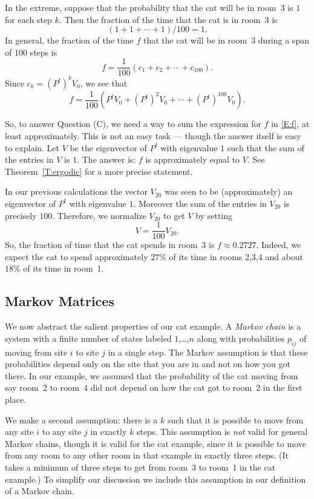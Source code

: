 \documentclass{ximera}
\begin{document}
In the extreme, suppose that the probability that the cat will be in room~3 is
$1$ for each step $k$.  Then the fraction of the time that the cat is in room~3
is
\[
(1 + 1 + \cdots + 1)/100 = 1.
\]
In general, the fraction of the time $f$ that the cat will be in room~3
during a span of $100$ steps is
\[
f = \frac{1}{100}(c_1 + c_2 +\cdots + c_{100}).
\]
Since $c_k = (P^t)^kV_0$, we see that
\begin{equation}  \label{E:f}
f = \frac{1}{100}(P^tV_0 + (P^t)^2V_0 + \cdots + (P^t)^{100}V_0).
\end{equation}

So, to answer Question (C), we need a way to sum the expression for $f$
in \eqref{E:f}, at least approximately.  This is not an easy task --- though
the answer itself is easy to explain.  Let $V$ be the eigenvector of $P^t$
with eigenvalue $1$ such that the sum of the entries in $V$ is $1$.  The
answer is: $f$ is approximately equal to $V$.  See Theorem~\ref{T:ergodic}
for a more precise statement.

In our previous calculations the vector $V_{20}$ was seen to be (approximately)
an eigenvector of $P^t$ with eigenvalue $1$.  Moreover the sum of the entries
in $V_{20}$ is precisely $100$.  Therefore, we normalize $V_{20}$ to get $V$
by setting
\[
V =\frac{1}{100}V_{20}.
\]
So, the fraction of time that the cat spends in room~3 is $f\approx 0.2727$.
Indeed, we expect the cat to spend approximately $27\%$ of its time in rooms
2,3,4 and about $18\%$ of its time in room~1.

\subsection*{Markov Matrices}

We now abstract the salient properties of our cat example.  A
{\em Markov chain\/} is a system with a
finite number of states labeled
$1$,\dots,$n$ along with probabilities $p_{ij}$ of moving from site $i$ to
site $j$ in a single step.  The Markov assumption is that these probabilities
depend only on the site that you are in and not on how you got there.  In our
example, we assumed that the probability of the cat moving from say room~2 to
room~4 did not depend on how the cat got to room~2 in the first place.

We make a second assumption: there is a $k$ such that it is possible to move
from any site $i$ to any site $j$ in exactly $k$ steps.  This assumption is
{\em not\/} valid for general Markov chains, though it is valid for the cat
example, since it is possible to move from any room to any other room in that
example in exactly three steps.  (It takes a minimum of three steps to get
from room~3 to room~1 in the cat example.)  To simplify our discussion we
include this assumption in our definition of a Markov chain.
\end{document}
